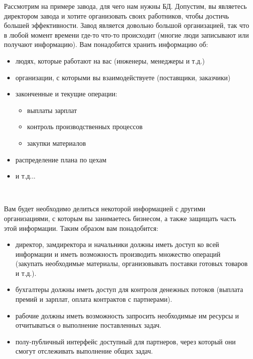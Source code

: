 
Рассмотрим на примере завода, для чего нам нужны БД. Допустим, вы являетесь директором завода и хотите организовать своих работников, чтобы достичь большей эффективности. Завод является довольно большой организацией, так что в любой момент времени где-то что-то происходит (многие люди записывают или получают информацию). Вам понадобится хранить информацию об: \\

\begin{itemize}
  \item людях, которые работают на вас (инженеры, менеджеры и т.д.)
  \item организации, с которыми вы взаимодействуете (поставщики, заказчики)
  \item законченные и текущие операции:
    \begin{itemize}
      \item выплаты зарплат
      \item контроль производственных процессов
      \item закупки материалов
    \end{itemize}
  \item распределение плана по цехам
  \item и т.д...
\end{itemize}
\

Вам будет необходимо делиться некоторой информацией с другими организациями, с которым вы занимаетесь бизнесом, а также защищать часть этой информации. Таким образом вам понадобится: \\

\begin{itemize}
  \item директор, замдиректора и начальники должны иметь доступ ко всей информации и иметь возможность производить множество операций (закупать необходимые материалы, организовывать поставки готовых товаров и т.д.).
  \item бухгалтеры должны иметь доступ для контроля денежных потоков (выплата премий и зарплат, оплата контрактов с партнерами).
  \item рабочие должны иметь возможность запросить необходимые им ресурсы и отчитываться о выполнение поставленных задач.
  \item полу-публичный интерфейс доступный для партнеров, через который они смогут отслеживать выполнение общих задач.
\end{itemize}
\

